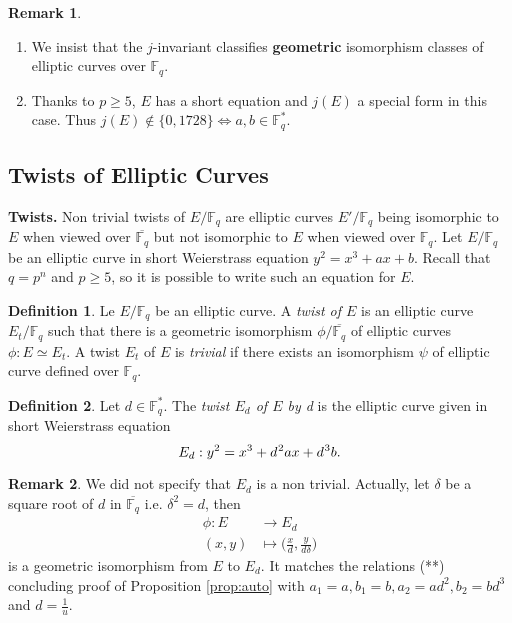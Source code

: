 \documentclass[10pt]{article}
\theoremstyle{definition}
\newtheorem{definition}{Definition}
\newtheorem{remark}{Remark}
\newcommand{\F}{\mathbb{F}}
\begin{document}
\noindent \begin{remark}
\begin{enumerate}
\item We insist that the $j$-invariant classifies \textbf{geometric} isomorphism classes of elliptic curves over $\F_q$. 
\item Thanks to $p \geq 5$, $E$ has a short equation and $j(E)$ a special form in this case.
Thus $j(E) \notin \lbrace 0, 1728 \rbrace \Leftrightarrow a,b \in \F_q^{*}$.
\end{enumerate}
\end{remark}

\subsection{Twists of Elliptic Curves}

\noindent \textbf{Twists.} Non trivial twists of $E/\F_q$ are elliptic curves $E'/\F_q$ being isomorphic to $E$ when viewed over $\overline{\F_q}$ but not isomorphic to $E$ when viewed over $\F_q$.
Let $E/\F_q$ be an elliptic curve in short Weierstrass equation $y^2 = x^3+ax+b$.
Recall that $q = p^n$ and $p \geq 5$, so it is possible to write such an equation for $E$. 

\begin{definition}
Le $E/\F_q$ be an elliptic curve.
A \textsl{twist of $E$} is an elliptic curve $E_t/\F_q$ such that there is a geometric isomorphism $\phi/\overline{\F_q}$ of elliptic curves $\phi : E \simeq E_t$.
A twist $E_t$ of $E$ is \textsl{trivial} if there exists an isomorphism $\psi$ of elliptic curve defined over $\F_q$.
\end{definition}

\begin{definition}
Let $d \in \F_q^*$.
The \textsl{twist $E_d$ of $E$ by d} is the elliptic curve given in short Weierstrass equation
\[ E_d : y^2 = x^3 + d^{\mkern1mu 2}ax + d^{\mkern1mu 3}b.\]
\end{definition}

\begin{remark}
We did not specify that $E_d$ is a non trivial.
Actually, let $\delta$ be a square root of $d$ in $\overline{\F_q}$ i.e. $\delta^2 = d$, then
\begin{align*}
\phi : E & \to E_d\\
      (x,y)& \mapsto \big(\frac{x}{d},\frac{y}{d\delta}\big)
\end{align*}
is a geometric isomorphism from $E$ to $E_d$.
It matches the relations (**) concluding proof of Proposition \ref{prop:auto} with $a_1=a, b_1=b, a_2 = ad^2, b_2=bd^3$ and $d = \frac1u$.
\end{remark}
\end{document}
